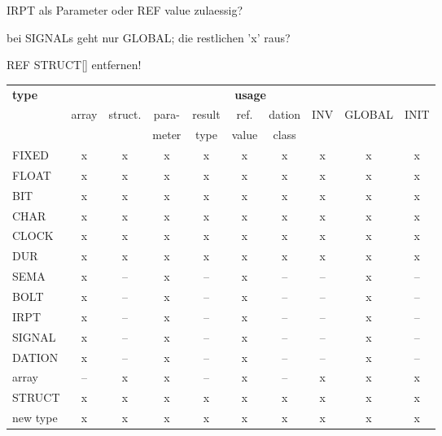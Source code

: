\begin{discuss}
IRPT als Parameter oder REF value zulaessig?

bei SIGNALs geht nur GLOBAL; die restlichen 'x' raus?

REF STRUCT[] entfernen!
\end{discuss}
\begin{table}[htb]
\begin{tabular}{lccccccccc}
{\bf type}     & \multicolumn{9}{c}{{\bf usage}} \\ 
               & array & struct. & para- & result & ref.  & dation & INV & GLOBAL & INIT \\ 
               &       &         & meter & type   & value & class  &     &        &      \\ \hline
FIXED          & x     &  x      & x     &  x     &  x    &   x    &  x  &    x   &  x   \\
FLOAT          & x     &  x      & x     &  x     &  x    &   x    &  x  &    x   &  x   \\
BIT            & x     &  x      & x     &  x     &  x    &   x    &  x  &    x   &  x   \\
CHAR           & x     &  x      & x     &  x     &  x    &   x    &  x  &    x   &  x   \\
CLOCK          & x     &  x      & x     &  x     &  x    &   x    &  x  &    x   &  x   \\
DUR            & x     &  x      & x     &  x     &  x    &   x    &  x  &    x   &  x   \\
SEMA           & x     &  --     & x     &  --    &  x    &   --   &  -- &    x   &  --  \\
BOLT           & x     &  --     & x     &  --    &  x    &   --   &  -- &    x   &  --  \\
IRPT           & x     &  --     & x     &  --    &  x    &   --   &  -- &    x   &  --  \\
SIGNAL         & x     &  --     & x     &  --    &  x    &   --   &  -- &    x   &  --  \\
DATION         & x     &  --     & x     &  --    &  x    &   --   &  -- &    x   &  --  \\
array          & --    &  x      & x     &  --    &  x    &   --   &  x  &    x   &  x   \\
STRUCT         & x     &  x      & x     &  x     &  x    &   x    &  x  &    x   &  x   \\
new type       & x     &  x      & x     &  x     &  x    &   x    &  x  &    x   &  x   \\

\end{tabular}
\end{table}

